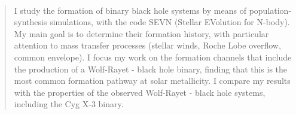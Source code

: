 \documentclass[a4paper,titlepage]{book}     	%
\newenvironment{abstract}{\newpage \thispagestyle{empty} \vspace*{3\baselineskip}
	\begin{center}\Large\textbf\abstractname\end{center}
	\begin{quotation}
	}{\end{quotation}\clearpage}
\begin{document}
\frontmatter

\begin{frontespizio}
	\Preambolo{\renewcommand{\frontinstitutionfont}{\fontsize{15}{12}\bfseries}}
	\Preambolo{\renewcommand{\frontdivisionfont}{\fontsize{16}{30}\selectfont}}
	\Preambolo{\renewcommand{\frontpretitlefont}{\fontsize{16}{20}\scshape}}
	\Preambolo{\renewcommand{\fronttitlefont}{\fontsize{19}{35}\bfseries}}
	\Preambolo{\renewcommand{\frontnamesfont}{\fontsize{15}{20}\bfseries}}
	\Preambolo{\renewcommand{\frontfixednamesfont}{\fontsize{13}{20}\selectfont}}

	\Rientro{2cm}
\end{frontespizio}	

\
\begin{abstract}
I study the formation of binary black hole systems by means of population-synthesis simulations, with the code SEVN (Stellar EVolution for N-body). My main goal is to determine their formation history, with particular attention to mass transfer processes (stellar winds, Roche Lobe overflow, common envelope). I focus my work on the formation channels that include the production of a Wolf-Rayet - black hole binary, finding that this is the most common formation pathway at solar metallicity. I compare my results with the properties of the observed Wolf-Rayet - black hole systems, including the Cyg X-3 binary.

\end{abstract}

\tableofcontents
{}

\mainmatter
\end{document}
